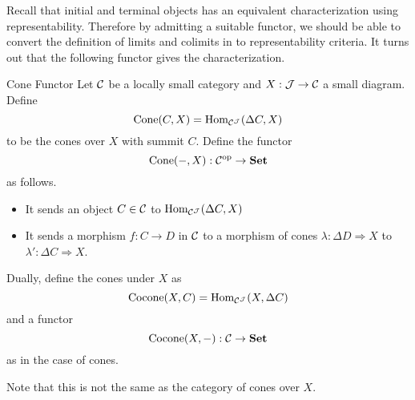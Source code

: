 \documentclass[a4paper]{article}
\begin{document}
Recall that initial and terminal objects has an equivalent characterization using representability. Therefore by admitting a suitable functor, we should be able to convert the definition of limits and colimits in to representability criteria. It turns out that the following functor gives the characterization. 

\begin{defn}{Cone Functor}{} Let $\mathcal{C}$ be a locally small category and $X:\mathcal{J}\to\mathcal{C}$ a small diagram. Define $$\text{Cone}(C,X)=\operatorname{Hom}_{\mathcal{C}^{\mathcal{J}}}(\Delta C,X)$$ to be the cones over $X$ with summit $C$. Define the functor $$\text{Cone}(-,X):\mathcal{C}^\text{op}\to\bold{Set}$$ as follows. 
\begin{itemize}
\item It sends an object $C\in\mathcal{C}$ to $\operatorname{Hom}_{\mathcal{C}^{\mathcal{J}}}(\Delta C,X)$
\item It sends a morphism $f:C\to D$ in $\mathcal{C}$ to a morphism of cones $\lambda:\Delta D\Rightarrow X$ to $\lambda':\Delta C\Rightarrow X$. 
\end{itemize}
Dually, define the cones under $X$ as $$\text{Cocone}(X,C)=\operatorname{Hom}_{\mathcal{C}^{\mathcal{J}}}(X,\Delta C)$$ and a functor $$\text{Cocone}(X,-):\mathcal{C}\to\bold{Set}$$ as in the case of cones. 
\end{defn}

Note that this is not the same as the category of cones over $X$. 
\end{document}
